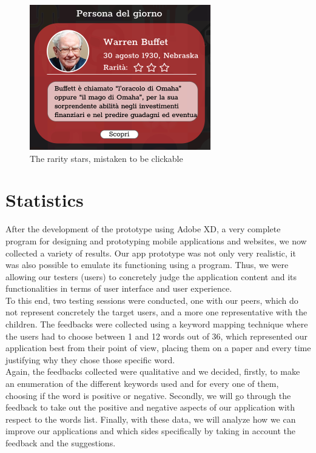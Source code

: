 \documentclass[12pt]{scrartcl}
\begin{document}
	\begin{figure}[H]
		\centering
		\includegraphics{../images/GA6_Stars.png}
		\caption{The rarity stars, mistaken to be clickable}
		\label{stars}
	\end{figure}
	
	\newpage
	
	
\section{Statistics}


	After the development of the prototype using Adobe XD, a very complete program for designing and prototyping mobile applications and websites, we now collected a variety of results. Our app prototype was not only very realistic, it was also possible to emulate its functioning using a program. Thus, we were allowing our testers (users) to concretely judge the application content and its functionalities in terms of user interface and user experience. \\

	To this end, two testing sessions were conducted, one with our peers, which do not represent concretely the target users, and a more one representative with the children. The feedbacks were collected using a keyword mapping technique where the users had to choose between 1 and 12 words out of 36, which represented our application best from their point of view, placing them on a paper and every time justifying why they chose those specific word.\\

	Again, the feedbacks collected were qualitative and we decided, firstly, to make an enumeration of the different keywords used and for every one of them, choosing if the word is positive or negative. Secondly, we will go through the feedback to take out the positive and negative aspects of our application with respect to the words list. Finally, with these data, we will analyze how we can improve our applications and which sides specifically by taking in account the feedback and the suggestions.\\
\end{document}
